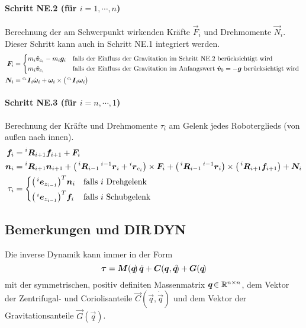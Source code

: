 			\paragraph{Schritt NE.2 (für \( i = 1, \cdots, n \))}
				Berechnung der am Schwerpunkt wirkenden Kräfte \( \vec{F}_i \) und Drehmomente \( \vec{N}_i \). Dieser Schritt kann auch in Schritt NE.1 integriert werden.
				\begin{align*}
					\vec{F}_i &=
						\begin{cases*}
							m_i \vec{\dot{v}}_{c_i} - m_i \vec{g}_i & falls der Einfluss der Gravitation im Schritt NE.2 berücksichtigt wird \\
							m_i \vec{\dot{v}}_{c_i}                 & falls der Einfluss der Gravitation im Anfangswert \( \vec{\dot{v}}_0 = -\vec{g} \) berücksichtigt wird
						\end{cases*} \\
					\vec{N}_i &= \inreferenceto{c_i}{\mat{I}}_i \dot{\vec{\omega}}_i + \vec{\omega}_i \times \big( \inreferenceto{c_i}{\mat{I}}_i \vec{\omega}_i \big)
				\end{align*}

			\paragraph{Schritt NE.3 (für \( i = n, \cdots, 1 \))}
				Berechnung der Kräfte und Drehmomente \( \tau_i \) am Gelenk jedes Roboterglieds (von außen nach innen).
				\begin{align*}
					\vec{f}_i &= \inreferenceto{i}{\mat{R}}_{i + 1} \vec{f}_{i + 1} + \vec{F}_i \\
					\vec{n}_i &= \inreferenceto{i}{\mat{R}}_{i + 1} \vec{n}_{i + 1} + \big( \inreferenceto{i}{\mat{R}}_{i - 1} \inreferenceto{i - 1}{\vec{r}}_i + \inreferenceto{i}{\vec{r}}_{c_i} \big) \times \vec{F}_i + \big( \inreferenceto{i}{\mat{R}}_{i - 1} \inreferenceto{i - 1}{\vec{r}}_i \big) \times \big( \inreferenceto{i}{\mat{R}}_{i + 1} \vec{f}_{i + 1} \big) + \vec{N}_i \\
					\tau_i &=
						\begin{cases*}
							\big( \inreferenceto{i}{\vec{e}}_{z_{i - 1}} \big)^T \vec{n}_i & falls \(i\) Drehgelenk \\
							\big( \inreferenceto{i}{\vec{e}}_{z_{i - 1}} \big)^T \vec{f}_i & falls \(i\) Schubgelenk
						\end{cases*}
				\end{align*}

		\subsection{Bemerkungen und DIR\,DYN}
			Die inverse Dynamik \INVDYN kann immer in der Form
			\begin{equation*}
				\bm{\tau} = \bm{M}(\bm{q}\!)\, \ddot{\bm{q}} + \bm{C}(\bm{q}, \dot{\bm{q}}\!) + \bm{G}(\bm{q}\!)
			\end{equation*}
			mit der symmetrischen, positiv definiten Massenmatrix \( \bm{\bm{q}\!} \in \mathbb{R}^{n \times n} \), dem Vektor der Zentrifugal- und Coriolisanteile \( \vec{C}(\vec{q}, \dot{\vec{q}}\!) \) und dem Vektor der Gravitationsanteile \( \vec{G}(\vec{q}\!) \).

